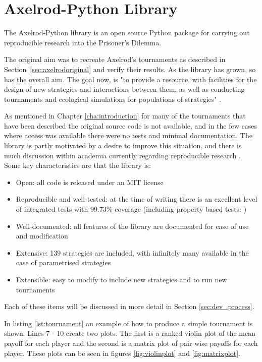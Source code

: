 \section{Axelrod-Python Library}\label{sec:axelrod-python}

The Axelrod-Python library \cite{axelrodproject} is an open source Python package for carrying out reproducible research into the Prisoner's Dilemma.

The original aim was to recreate Axelrod's tournaments as described in Section~\ref{sec:axelrodoriginal} and verify their results.
As the library has grown, so has the overall aim.
The goal now, is "to provide a resource, with facilities for the design of new strategies and interactions between them, as well as conducting tournaments and ecological simulations for populations of strategies" \cite{Knight2016}.

As mentioned in Chapter \ref{cha:introduction} for many of the tournaments that have been described the original source code is not available, and in the few cases where access was available there were no tests and minimal documentation.
The library is partly motivated by a desire to improve this situation, and there is much discussion within academia currently regarding reproducible research \cite{Crick2014, Hong2015, Procter2012, Sandve2013}.
Some key characteristics are that the library is:

\begin{itemize}
    \item Open: all code is released under an MIT license \cite{Rosen2004}
    \item Reproducible and well-tested: at the time of writing there is an excellent level of integrated tests with 99.73\% coverage (including property based tests: \cite{Hypothesis3.6.1})
    \item Well-documented: all features of the library are documented for ease of use and modification
    \item Extensive: 139 strategies are included, with infinitely many available in the case of parametrised strategies
    \item Extensible: easy to modify to include new strategies and to run new tournaments
\end{itemize}

Each of these items will be discussed in more detail in Section \ref{sec:dev_process}.

In listing \ref{lst:tournament} an example of how to produce a simple tournament is shown.
Lines 7 - 10 create two plots.
The first is a ranked violin plot of the mean payoff for each player and the second is a matrix plot of pair wise payoffs for each player.
These plots can be seen in figures \ref{fig:violinplot} and \ref{fig:matrixplot}.

